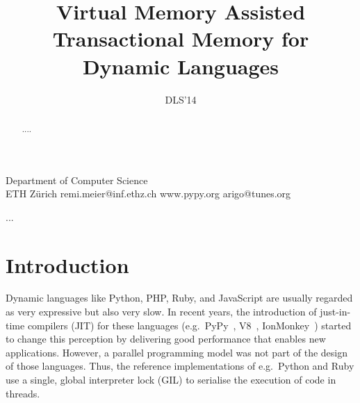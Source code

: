 \documentclass{sigplanconf}
\begin{document}
\setlength{\pdfpageheight}{\paperheight}
\setlength{\pdfpagewidth}{\paperwidth}






\title{Virtual Memory Assisted Transactional Memory for Dynamic Languages}
\subtitle{DLS'14}

           {Department of Computer Science\\ ETH Zürich}
           {remi.meier@inf.ethz.ch}
           {www.pypy.org}
           {arigo@tunes.org}

\maketitle

\begin{abstract}
....
\end{abstract}



\keywords
...

\section{Introduction}


Dynamic languages like Python, PHP, Ruby, and JavaScript are usually
regarded as very expressive but also very slow. In recent years, the
introduction of just-in-time compilers (JIT) for these languages
(e.g.\ PyPy~\cite{cfbolz09}, V8~\cite{kevin10}, IonMonkey~\cite{ionmonkey})
started to change this perception by delivering
good performance that enables new applications. However, a parallel
programming model was not part of the design of those languages. Thus,
the reference implementations of e.g.\ Python and Ruby use a single,
global interpreter lock (GIL) to serialise the execution of code in
threads.
\end{document}
